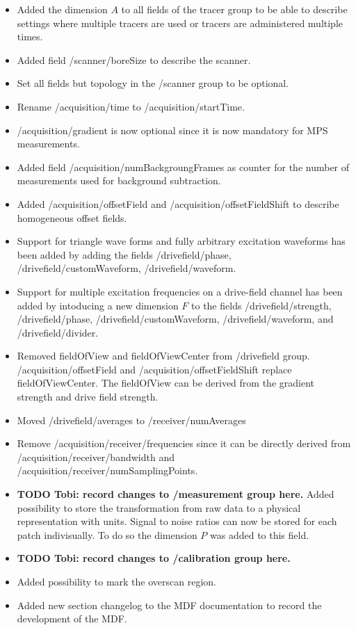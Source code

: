 \documentclass[landscape,a4paper]{article} %
\newcommand{\inlvar}[1]{{\ttfamily#1}}
\begin{document}
\begin{multicols}{2}
\begin{itemize}
	\item Added the dimension $A$ to all fields of the \inlvar{tracer} group to be able to describe settings where multiple tracers are used or tracers are administered multiple times.
	\item Added field \inlvar{/scanner/boreSize} to describe the scanner.
	\item Set all fields but \inlvar{topology} in the \inlvar{/scanner} group to be optional.
	\item Rename \inlvar{/acquisition/time} to \inlvar{/acquisition/startTime}.
	\item \inlvar{/acquisition/gradient} is now optional since it is now mandatory for MPS measurements.
	\item Added field \inlvar{/acquisition/numBackgroungFrames} as counter for the number of measurements used for background subtraction.
	\item Added \inlvar{/acquisition/offsetField} and \inlvar{/acquisition/offsetFieldShift} to describe homogeneous offset fields.
	\item Support for triangle wave forms and fully arbitrary excitation waveforms has been added by adding the fields \inlvar{/drivefield/phase}, \inlvar{/drivefield/customWaveform}, \inlvar{/drivefield/waveform}.
	\item Support for multiple excitation frequencies on a drive-field channel has been added by intoducing a new dimension $F$ to the fields \inlvar{/drivefield/strength}, \inlvar{/drivefield/phase}, \inlvar{/drivefield/customWaveform}, \inlvar{/drivefield/waveform}, and \inlvar{/drivefield/divider}.
	\item Removed \inlvar{fieldOfView} and \inlvar{fieldOfViewCenter} from \inlvar{/drivefield} group. \inlvar{/acquisition/offsetField} and \inlvar{/acquisition/offsetFieldShift} replace \inlvar{fieldOfViewCenter}. The \inlvar{fieldOfView} can be derived from the gradient strength and drive field strength.
	\item Moved \inlvar{/drivefield/averages} to \inlvar{/receiver/numAverages}
	\item Remove \inlvar{/acquisition/receiver/frequencies} since it can be directly derived from \inlvar{/acquisition/receiver/bandwidth} and \inlvar{/acquisition/receiver/numSamplingPoints}.
	\item \textbf{TODO Tobi: record changes to \inlvar{/measurement} group here.} Added possibility to store the transformation from raw data to a physical representation with units. Signal to noise ratios can now be stored for each patch indivisually. To do so the dimension $P$ was added to this field.
	\item \textbf{TODO Tobi: record changes to \inlvar{/calibration} group here.}
	\item Added possibility to mark the overscan region.
	\item Added new section changelog to the MDF documentation to record the development of the MDF.
\end{itemize}



\end{multicols}
\end{document}
